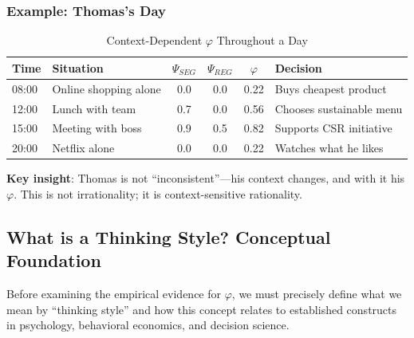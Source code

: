 \subsubsection{Example: Thomas's Day}

\begin{table}[htbp]
\centering
\caption{Context-Dependent $\varphi$ Throughout a Day}
\label{tab:thomas-day}
\begin{tabular}{@{}llcccl@{}}
\toprule
\textbf{Time} & \textbf{Situation} & $\Psi_{SEG}$ & $\Psi_{REG}$ & $\varphi$ & \textbf{Decision} \\
\midrule
08:00 & Online shopping alone & 0.0 & 0.0 & 0.22 & Buys cheapest product \\
12:00 & Lunch with team & 0.7 & 0.0 & 0.56 & Chooses sustainable menu \\
15:00 & Meeting with boss & 0.9 & 0.5 & 0.82 & Supports CSR initiative \\
20:00 & Netflix alone & 0.0 & 0.0 & 0.22 & Watches what he likes \\
\bottomrule
\end{tabular}
\end{table}

\textbf{Key insight}: Thomas is not ``inconsistent''---his context changes, and with it his $\varphi$. This is not irrationality; it is context-sensitive rationality.





\subsection{What is a Thinking Style? Conceptual Foundation}
\label{sec:thinking-style-concept}

Before examining the empirical evidence for $\varphi$, we must precisely define what we mean by ``thinking style'' and how this concept relates to established constructs in psychology, behavioral economics, and decision science.

